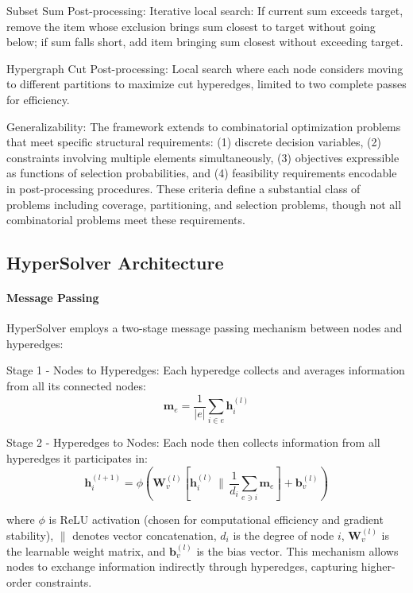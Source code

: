 \documentclass[conference]{IEEEtran}
\begin{document}
Subset Sum Post-processing: Iterative local search: If current sum exceeds target, remove the item whose exclusion brings sum closest to target without going below; if sum falls short, add item bringing sum closest without exceeding target.

Hypergraph Cut Post-processing: Local search where each node considers moving to different partitions to maximize cut hyperedges, limited to two complete passes for efficiency.

Generalizability: The framework extends to combinatorial optimization problems that meet specific structural requirements: (1) discrete decision variables, (2) constraints involving multiple elements simultaneously, (3) objectives expressible as functions of selection probabilities, and (4) feasibility requirements encodable in post-processing procedures. These criteria define a substantial class of problems including coverage, partitioning, and selection problems, though not all combinatorial problems meet these requirements.

\subsection{HyperSolver Architecture}

\paragraph{Message Passing}
HyperSolver employs a two-stage message passing mechanism between nodes and hyperedges:

Stage 1 - Nodes to Hyperedges: Each hyperedge collects and averages information from all its connected nodes:
\begin{equation}
\mathbf{m}_e = \frac{1}{|e|} \sum_{i \in e} \mathbf{h}_i^{(l)}
\end{equation}

Stage 2 - Hyperedges to Nodes: Each node then collects information from all hyperedges it participates in:
\begin{equation}
\mathbf{h}_i^{(l+1)} = \phi\left(\mathbf{W}_v^{(l)} \left[\mathbf{h}_i^{(l)} \,\|\, \frac{1}{d_i} \sum_{e \ni i} \mathbf{m}_e\right] + \mathbf{b}_v^{(l)}\right)
\end{equation}

where \(\phi\) is ReLU activation (chosen for computational efficiency and gradient stability), \(\|\) denotes vector concatenation, \(d_i\) is the degree of node \(i\), \(\mathbf{W}_v^{(l)}\) is the learnable weight matrix, and \(\mathbf{b}_v^{(l)}\) is the bias vector. This mechanism allows nodes to exchange information indirectly through hyperedges, capturing higher-order constraints.
\end{document}
